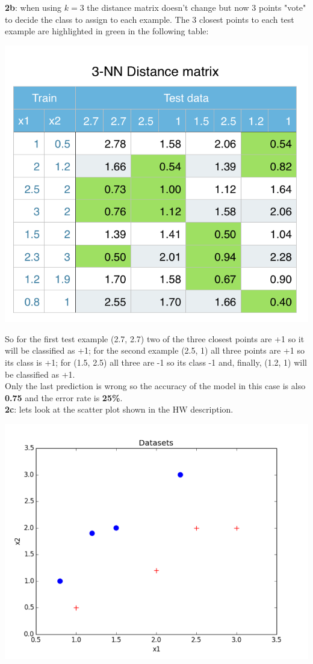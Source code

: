 \documentclass[11pt]{article}
\begin{document}
\textbf{2b}: when using $k = 3$ the distance matrix doesn't change but now 3 points "vote" to decide the class to assign to each example. The 3 closest points to each test example are highlighted in green in the following table:
\begin{center}
\includegraphics[scale=0.75]{3-nn-distances.png}
\end{center}
So for the first test example (2.7, 2.7) two of the three closest points are +1 so it will be classified as +1; for the second example (2.5, 1) all three points are +1 so its class is +1; for (1.5, 2.5) all three are -1 so its class -1 and, finally, (1.2, 1) will be classified as +1. \\
Only the last prediction is wrong so the accuracy of the model in this case is also \textbf{0.75} and the error rate is \textbf{25\%}.\\

\textbf{2c}: lets look at the scatter plot shown in the HW description.
\begin{center}
\includegraphics[scale=0.55]{q2-dataplot-ref.png}
\end{center}
\end{document}
